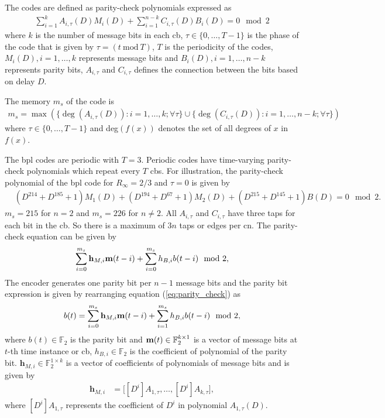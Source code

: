 The codes are defined as parity-check polynomials expressed as
\begin{align}
\sum_{i=1}^{k}A_{i,\tau}(D)M_i(D)+\sum_{i=1}^{n-k}C_{i,\tau}(D)B_i(D)=0\mod 2
\end{align}
where $k$ is the number of message bits in each \ac{cb}, $\tau \in \{0,\dots,T-1\}$ is the phase of the code that is given by $\tau=(t\ \text{mod}\ T)$, $T$ is the periodicity of the codes, $M_i(D),i=1,\dots,k$ represents message bits and $B_i(D),i=1,\dots,n-k$ represents parity bits, $A_{i,\tau}$ and $C_{i,\tau}$ defines the connection between the bits based on delay $D$.

The memory $m_s$ of the code is
\begin{align}
m_s=\max\left(\{\deg(A_{i,\tau}(D)):i=1,\dots,k;\forall\tau\}\cup\{\deg(C_{i,\tau}(D)):i=1,\dots,n-k;\forall\tau\}\right)
\end{align}
where $\tau \in \{0,\dots,T-1\}$ and deg$(f(x))$ denotes the set of all degrees of $x$ in $f(x)$.

The \ac{bpl} codes are periodic with $T=3$. Periodic codes have time-varying parity-check polynomials which repeat every $T$ \acp{cb}. For illustration, the parity-check polynomial of the \ac{bpl} code for $R_\infty=2/3$ and $\tau=0$ is given by
\begin{align}
&(D^{214}+D^{185}+1)M_1(D)+(D^{194}+D^{67}+1)M_2(D)+(D^{215}+D^{145}+1)B(D)=0\mod 2.
\end{align}
$m_s=215$ for $n=2$ and $m_s=226$ for $n\neq2$. All $A_{i,\tau}$ and $C_{i,\tau}$ have three taps for each bit in the \ac{cb}. So there is a maximum of $3n$ taps or edges per \ac{cn}. The parity-check equation can be given by
\begin{align}\label{eq:parity_check}
\sum_{i=0}^{m_s}\mathbf{h}_{M,i}\mathbf{m}(t-i)+\sum_{i=0}^{m_s}h_{B,i}b(t-i) \mod 2,
\end{align}
The encoder generates one parity bit per $n-1$ message bits and the parity bit expression is given by rearranging equation (\ref{eq:parity_check}) as
\begin{align}
b(t)=\sum_{i=0}^{m_s}\mathbf{h}_{M,i}\mathbf{m}(t-i)+\sum_{i=1}^{m_s}h_{B,i}b(t-i) \mod 2,
\end{align}
where $b(t)\in\mathbb{F}_2$ is the parity bit and $\mathbf{m}(t)\in\mathbb{F}_2^{k\times 1}$ is a vector of message bits at $t$-th time instance or \ac{cb}, $h_{B,i}\in\mathbb{F}_2$ is the coefficient of polynomial of the parity bit. $\mathbf{h}_{M,i}\in\mathbb{F}_2^{1\times k}$ is a vector of coefficients of polynomials of message bits and is given by
\begin{align}
\mathbf{h}_{M,i}&= \big[[D^i]A_{1,\tau},\dots,[D^i]A_{k,\tau}\big],
\end{align}
where $[D^i]A_{1,\tau}$ represents the coefficient of $D^i$ in polynomial $A_{1,\tau}(D)$.

